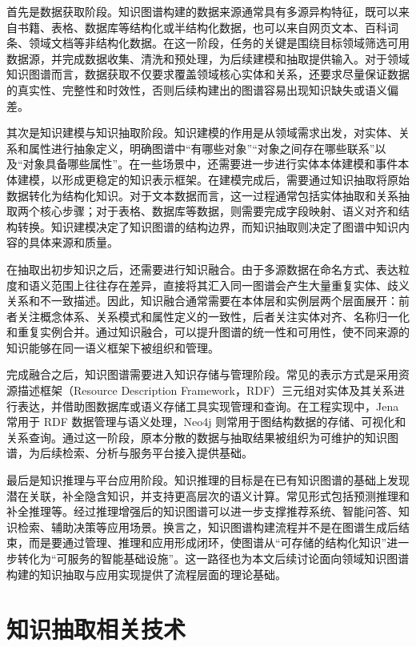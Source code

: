 首先是数据获取阶段。知识图谱构建的数据来源通常具有多源异构特征，既可以来自书籍、表格、数据库等结构化或半结构化数据，也可以来自网页文本、百科词条、领域文档等非结构化数据。在这一阶段，任务的关键是围绕目标领域筛选可用数据源，并完成数据收集、清洗和预处理，为后续建模和抽取提供输入。对于领域知识图谱而言，数据获取不仅要求覆盖领域核心实体和关系，还要求尽量保证数据的真实性、完整性和时效性，否则后续构建出的图谱容易出现知识缺失或语义偏差。

其次是知识建模与知识抽取阶段。知识建模的作用是从领域需求出发，对实体、关系和属性进行抽象定义，明确图谱中“有哪些对象”“对象之间存在哪些联系”以及“对象具备哪些属性”。在一些场景中，还需要进一步进行实体本体建模和事件本体建模，以形成更稳定的知识表示框架。在建模完成后，需要通过知识抽取将原始数据转化为结构化知识。对于文本数据而言，这一过程通常包括实体抽取和关系抽取两个核心步骤；对于表格、数据库等数据，则需要完成字段映射、语义对齐和结构转换。知识建模决定了知识图谱的结构边界，而知识抽取则决定了图谱中知识内容的具体来源和质量。

在抽取出初步知识之后，还需要进行知识融合。由于多源数据在命名方式、表达粒度和语义范围上往往存在差异，直接将其汇入同一图谱会产生大量重复实体、歧义关系和不一致描述。因此，知识融合通常需要在本体层和实例层两个层面展开：前者关注概念体系、关系模式和属性定义的一致性，后者关注实体对齐、名称归一化和重复实例合并。通过知识融合，可以提升图谱的统一性和可用性，使不同来源的知识能够在同一语义框架下被组织和管理。

完成融合之后，知识图谱需要进入知识存储与管理阶段。常见的表示方式是采用资源描述框架（Resource Description Framework，RDF）三元组对实体及其关系进行表达，并借助图数据库或语义存储工具实现管理和查询。在工程实现中，Jena 常用于 RDF 数据管理与语义处理，Neo4j 则常用于图结构数据的存储、可视化和关系查询。通过这一阶段，原本分散的数据与抽取结果被组织为可维护的知识图谱，为后续检索、分析与服务平台接入提供基础。

最后是知识推理与平台应用阶段。知识推理的目标是在已有知识图谱的基础上发现潜在关联，补全隐含知识，并支持更高层次的语义计算。常见形式包括预测推理和补全推理等。经过推理增强后的知识图谱可以进一步支撑推荐系统、智能问答、知识检索、辅助决策等应用场景。换言之，知识图谱构建流程并不是在图谱生成后结束，而是要通过管理、推理和应用形成闭环，使图谱从“可存储的结构化知识”进一步转化为“可服务的智能基础设施”。这一路径也为本文后续讨论面向领域知识图谱构建的知识抽取与应用实现提供了流程层面的理论基础。
\section{知识抽取相关技术}

